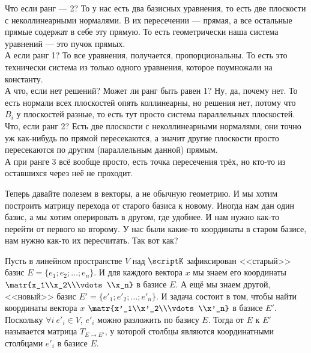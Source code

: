 \documentclass{article}
\begin{document}
\begin{itemize}
\begin{Comment}
            Что если ранг --- 2? То у нас есть два базисных уравнения, то есть две плоскости с неколлинеарными нормалями. В их пересечении --- прямая, а все остальные прямые содержат в себе эту прямую. То есть геометрически наша система уравнений --- это пучок прямых.\\
            А если ранг 1? То все уравнения, получается, пропорциональны. То есть это технически система из только одного уравнения, которое поумножали на константу.\\
            А что, если нет решений? Может ли ранг быть равен 1? Ну, да, почему нет. То есть нормали всех плоскостей опять коллинеарны, но решения нет, потому что $B_i$ у плоскостей разные, то есть тут просто система параллельных плоскостей.\\
            Что, если ранг 2? Есть две плоскости с неколлинеарными нормалями, они точно уж как-нибудь по прямой пересекаются, а значит другие плоскости просто пересекаются по другим (параллельным данной) прямым.\\
            А при ранге 3 всё вообще просто, есть точка пересечения трёх, но кто-то из оставшихся через неё не проходит.
        \end{Comment}
        \begin{Comment}
            Теперь давайте полезем в векторы, а не обычную геометрию. И мы хотим построить матрицу перехода от старого базиса к новому. Иногда нам дан один базис, а мы хотим оперировать в другом, где удобнее. И нам нужно как-то перейти от первого ко второму. У нас были какие-то координаты в старом базисе, нам нужно как-то их пересчитать. Так вот как?
        \end{Comment}
        \dfn Пусть в линейном пространстве $V$ над $\scriptK$ зафиксирован <<старый>> базис $E=\{e_1;e_2;\ldots;e_n\}$. И для каждого вектора $x$ мы знаем его координаты $\matr{x_1\\x_2\\\vdots\\x_n}$ в базисе $E$. А ещё мы знаем другой, <<новый>> базис $E'=\{e'_1;e'_2;\ldots;e'_n\}$. И задача состоит в том, чтобы найти координаты вектора $x$ $\matr{x'_1\\x'_2\\\vdots\\x'_n}$ в базисе $E'$.\\
        Поскольку $\forall i~e'_i\in V$, $e'_i$ можно разложить по базису $E$. Тогда  от $E$ к $E'$ называется матрица $T_{E\to E'}$, у которой столбцы являются координатными столбцами $e'_i$ в базисе $E$.

\end{itemize}
\end{document}
